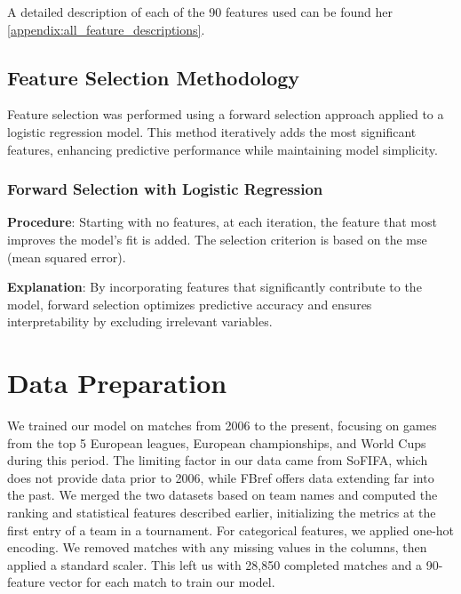 A detailed description of each of the 90 features used can be found her \ref{appendix:all_feature_descriptions}.

\subsection{Feature Selection Methodology}
\label{subsec:feature_selection_methodology}

Feature selection was performed using a forward selection approach applied to a logistic regression model. This method iteratively adds the most significant features, enhancing predictive performance while maintaining model simplicity.

\subsubsection{Forward Selection with Logistic Regression}
\label{subsubsec:forward_selection_logistic_regression}

\textbf{Procedure}: Starting with no features, at each iteration, the feature that most improves the model's fit is added. The selection criterion is based on the mse (mean squared error).

\textbf{Explanation}: By incorporating features that significantly contribute to the model, forward selection optimizes predictive accuracy and ensures interpretability by excluding irrelevant variables.

\section{Data Preparation}

We trained our model on matches from 2006 to the present, focusing on games from the top 5 European leagues, European championships, and World Cups during this period. The limiting factor in our data came from SoFIFA, which does not provide data prior to 2006, while FBref offers data extending far into the past. We merged the two datasets based on team names and computed the ranking and statistical features described earlier, initializing the metrics at the first entry of a team in a tournament. For categorical features, we applied one-hot encoding. We removed matches with any missing values in the columns, then applied a standard scaler. This left us with 28,850 completed matches and a 90-feature vector for each match to train our model.

